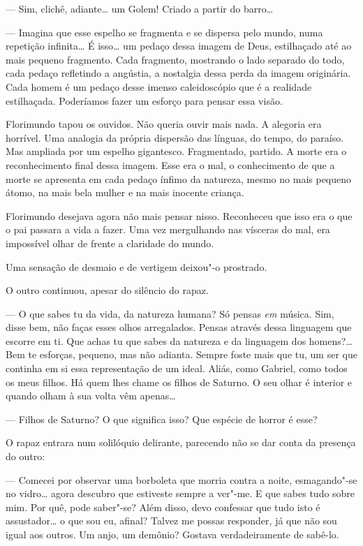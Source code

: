--- Sim, clichê, adiante\ldots{} um Golem! Criado a partir do barro\ldots{}

--- Imagina que esse espelho se fragmenta e se dispersa pelo mundo, numa
repetição infinita\ldots{} É isso\ldots{} um pedaço dessa imagem de Deus,
estilhaçado até ao mais pequeno fragmento. Cada fragmento, mostrando o
lado separado do todo, cada pedaço refletindo a angústia, a nostalgia
dessa perda da imagem originária. Cada homem é um pedaço desse imenso
caleidoscópio que é a realidade estilhaçada. Poderíamos fazer um esforço
para pensar essa visão.

Florimundo tapou os ouvidos. Não queria ouvir mais nada. A alegoria era
horrível. Uma analogia da própria dispersão das línguas, do tempo, do
paraíso. Mas ampliada por um espelho gigantesco. Fragmentado, partido. A
morte era o reconhecimento final dessa imagem. Esse era o mal, o
conhecimento de que a morte se apresenta em cada pedaço ínfimo da
natureza, mesmo no mais pequeno átomo, na mais bela mulher e na mais
inocente criança.

Florimundo desejava agora não mais pensar nisso. Reconheceu que isso era
o que o pai passara a vida a fazer. Uma vez mergulhando nas vísceras do
mal, era impossível olhar de frente a claridade do mundo.

Uma sensação de desmaio e de vertigem deixou"-o prostrado.

O outro continuou, apesar do silêncio do rapaz.

--- O que sabes tu da vida, da natureza humana? Só pensas \emph{em}
música. Sim, disse bem, não faças esses olhos arregalados. Pensas
através dessa linguagem que escorre em ti. Que achas tu que sabes da
natureza e da linguagem dos homens?\ldots{} Bem te esforças, pequeno, mas não
adianta. Sempre foste mais que tu, um ser que continha em si essa
representação de um ideal. Aliás, como Gabriel, como todos os meus
filhos. Há quem lhes chame os filhos de Saturno. O seu olhar é interior
e quando olham à sua volta vêm apenas\ldots{}

--- Filhos de Saturno? O que significa isso? Que espécie de horror é esse?

O rapaz entrara num solilóquio delirante, parecendo não se dar conta da
presença do outro:

--- Comecei por observar uma borboleta que morria contra a noite,
esmagando"-se no vidro\ldots{} agora descubro que estiveste sempre a ver"-me. E
que sabes tudo sobre mim. Por quê, pode saber"-se? Além disso, devo
confessar que tudo isto é assustador\ldots{} o que sou eu, afinal? Talvez
me possas responder, já que não sou igual aos outros. Um anjo, um
demônio? Gostava verdadeiramente de sabê-lo.

